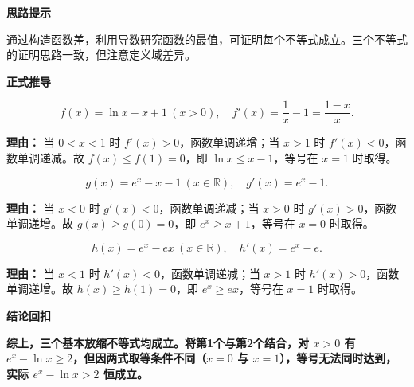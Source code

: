 \begin{proofbox}
	\textbf{\textcolor{CProof}{思路提示}}

	通过构造函数差，利用导数研究函数的最值，可证明每个不等式成立。三个不等式的证明思路一致，但注意定义域差异。

	\medskip
	\textbf{\textcolor{CProof}{正式推导}}
	\begin{description}[style=nextline, leftmargin=2.8em, labelsep=0.5em, itemsep=0.55em]
		\item[\textbf{步骤一（对数放缩证明）：}]
			\[
				f(x)=\ln x-x+1 \ (x>0),\quad f'(x)=\frac{1}{x}-1=\frac{1-x}{x}.
			\]
			\par\textbf{理由：} 当 $0<x<1$ 时 $f'(x)>0$，函数单调递增；当 $x>1$ 时 $f'(x)<0$，函数单调递减。故 $f(x) \le f(1)=0$，即 $\ln x \le x-1$，等号在 $x=1$ 时取得。

		\item[\textbf{步骤二（指数放缩一证明）：}]
			\[
				g(x)=e^x-x-1 \ (x\in\mathbb{R}),\quad g'(x)=e^x-1.
			\]
			\par\textbf{理由：} 当 $x<0$ 时 $g'(x)<0$，函数单调递减；当 $x>0$ 时 $g'(x)>0$，函数单调递增。故 $g(x) \ge g(0)=0$，即 $e^x \ge x+1$，等号在 $x=0$ 时取得。

		\item[\textbf{步骤三（指数放缩二证明）：}]
			\[
				h(x)=e^x-ex \ (x\in\mathbb{R}),\quad h'(x)=e^x-e.
			\]
			\par\textbf{理由：} 当 $x<1$ 时 $h'(x)<0$，函数单调递减；当 $x>1$ 时 $h'(x)>0$，函数单调递增。故 $h(x) \ge h(1)=0$，即 $e^x \ge ex$，等号在 $x=1$ 时取得。

	\end{description}

	\medskip
	\textbf{\textcolor{CProof}{结论回扣}}

	\textbf{综上，三个基本放缩不等式均成立。将第1个与第2个结合，对 $x>0$ 有 $e^x-\ln x \ge 2$，但因两式取等条件不同（$x=0$ 与 $x=1$），等号无法同时达到，实际 $e^x-\ln x >2$ 恒成立。}
\end{proofbox}
